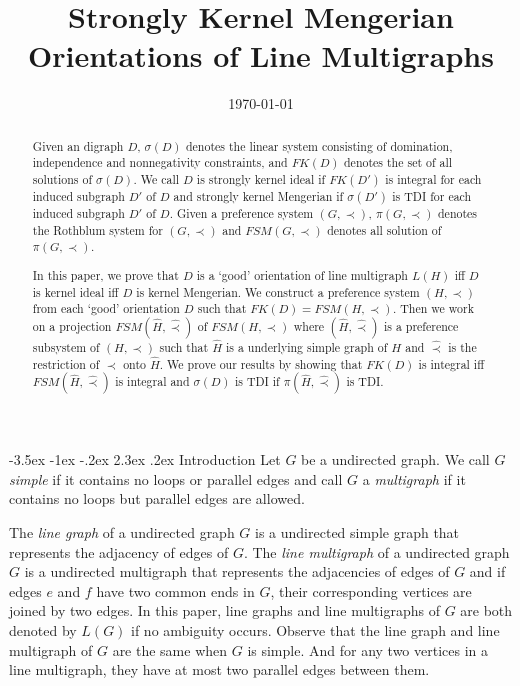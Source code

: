 \documentclass[11pt]{article}
\title{{\Large\bf  Strongly Kernel Mengerian Orientations of Line Multigraphs}}
\author{}
\makeatletter
\numberwithin{theorem}{section}
\renewcommand\section{%
  \@startsection{section}{1}
                {\z@}%
                {-3.5ex \@plus -1ex \@minus -.2ex}%
                {2.3ex \@plus.2ex}%
                {\large\bfseries}%
}
\makeatother
\begin{document}
\date{\today}


\maketitle

\jot

\begin{abstract}
Given an digraph $D$, $\sigma(D)$ denotes the linear system consisting of domination, independence and nonnegativity constraints, and $FK(D)$ denotes the set of all solutions of $\sigma(D)$. We call $D$ is strongly kernel ideal if $FK(D')$ is integral for each induced subgraph $D'$ of $D$ and strongly kernel Mengerian if $\sigma(D')$ is TDI for each induced subgraph $D'$ of $D$. Given a preference system $(G,\prec)$, $\pi(G,\prec)$ denotes the Rothblum system for $(G,\prec)$ and $FSM(G,\prec)$ denotes all solution of $\pi(G,\prec)$. 

In this paper, we prove that  $D$ is a `good' orientation of line multigraph $L(H)$ iff $D$ is kernel ideal iff $D$ is kernel Mengerian. We construct a preference system $(H,\prec)$ from each `good' orientation $D$ such that $FK(D)=FSM(H,\prec)$. Then we work on a projection $FSM(\hat{H},\hat\prec)$ of $FSM(H,\prec)$ where $(\hat{H},\hat\prec)$ is a preference subsystem of $(H,\prec)$ such that $\hat{H}$ is a underlying simple graph of $H$ and $\hat\prec$ is the restriction of $\prec$ onto $\hat{H}$. We prove our results by showing that $FK(D)$ is integral iff $FSM(\hat{H},\hat\prec)$ is integral and $\sigma(D)$ is TDI if $\pi(\hat{H},\hat\prec)$ is TDI.
\end{abstract}

\section{Introduction}
\label{intro}
Let $G$ be a undirected graph. We call $G$ \textit{simple} if it contains no loops or parallel edges and call $G$ a \textit{multigraph} if it contains no loops but parallel edges are allowed. 

The \textit{line graph} of a undirected graph $G$ is a undirected simple graph that represents the adjacency of edges of $G$. The \textit{line multigraph} of a undirected graph $G$ is a undirected multigraph that represents the adjacencies of edges of $G$ and if edges $e$ and $f$ have two common ends in $G$, their corresponding vertices are joined by two edges. In this paper, line graphs and line multigraphs of $G$ are both denoted by $L(G)$ if no ambiguity occurs. Observe that the line graph and line multigraph of $G$ are the same when $G$ is simple. And for any two vertices in a line multigraph, they have at most two parallel edges between them.
\end{document}
